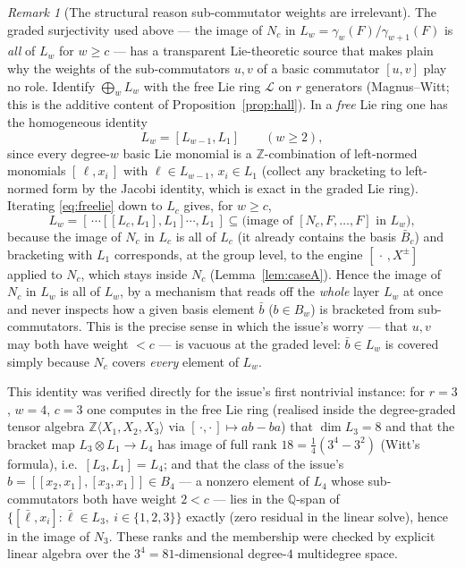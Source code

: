 \documentclass{amsart}
\theoremstyle{definition}
\theoremstyle{remark}
\newtheorem{remark}{Remark}
\begin{document}
\begin{remark}[The structural reason sub-commutator weights are irrelevant]
\label{rem:freelie}
The graded surjectivity used above --- the image of $N_c$ in
$L_w=\gamma_w(F)/\gamma_{w+1}(F)$ is \emph{all} of $L_w$ for $w\ge c$ --- has a
transparent Lie-theoretic source that makes plain why the weights of the
sub-commutators $u,v$ of a basic commutator $[u,v]$ play no role. Identify
$\bigoplus_w L_w$ with the free Lie ring $\mathcal L$ on $r$ generators
(Magnus--Witt; this is the additive content of Proposition~\ref{prop:hall}). In a
\emph{free} Lie ring one has the homogeneous identity
\begin{equation}\label{eq:freelie}
L_w=[L_{w-1},L_1]\qquad(w\ge2),
\end{equation}
since every degree-$w$ basic Lie monomial is a $\mathbb Z$-combination of left-normed
monomials $[\,\ell,x_i\,]$ with $\ell\in L_{w-1}$, $x_i\in L_1$ (collect any bracketing
to left-normed form by the Jacobi identity, which is exact in the graded Lie ring).
Iterating \eqref{eq:freelie} down to $L_c$ gives, for $w\ge c$,
\[
L_w=[\,\cdots[[L_c,L_1],L_1]\cdots,L_1\,]\subseteq \text{(image of $[N_c,F,\dots,F]$ in $L_w$)} ,
\]
because the image of $N_c$ in $L_c$ is all of $L_c$ (it already contains the basis
$\bar B_c$) and bracketing with $L_1$ corresponds, at the group level, to the engine
$[\,\cdot\,,X^{\pm}]$ applied to $N_c$, which stays inside $N_c$
(Lemma~\ref{lem:caseA}). Hence the image of $N_c$ in $L_w$ is all of $L_w$, by a
mechanism that reads off the \emph{whole} layer $L_w$ at once and never inspects how a
given basis element $\bar b$ ($b\in B_w$) is bracketed from sub-commutators. This is the
precise sense in which the issue's worry --- that $u,v$ may both have weight $<c$ --- is
vacuous at the graded level: $\bar b\in L_w$ is covered simply because $N_c$ covers
\emph{every} element of $L_w$.

This identity was verified directly for the issue's first nontrivial instance: for
$r=3$, $w=4$, $c=3$ one computes in the free Lie ring (realised inside the degree-graded
tensor algebra $\mathbb Z\langle X_1,X_2,X_3\rangle$ via $[\,\cdot,\cdot\,]\mapsto
ab-ba$) that $\dim L_3=8$ and that the bracket map
$L_3\otimes L_1\to L_4$ has image of full rank $18=\tfrac14(3^4-3^2)$ (Witt's formula),
i.e.\ $[L_3,L_1]=L_4$; and that the class of the issue's
$b=[[x_2,x_1],[x_3,x_1]]\in B_4$ --- a nonzero element of $L_4$ whose sub-commutators
both have weight $2<c$ --- lies in the $\mathbb Q$-span of
$\{[\bar\ell,x_i]:\bar\ell\in L_3,\ i\in\{1,2,3\}\}$ exactly (zero residual in the
linear solve), hence in the image of $N_3$. These ranks and the membership were checked
by explicit linear algebra over the $3^4=81$-dimensional degree-$4$ multidegree space.
\end{remark}
\end{document}
